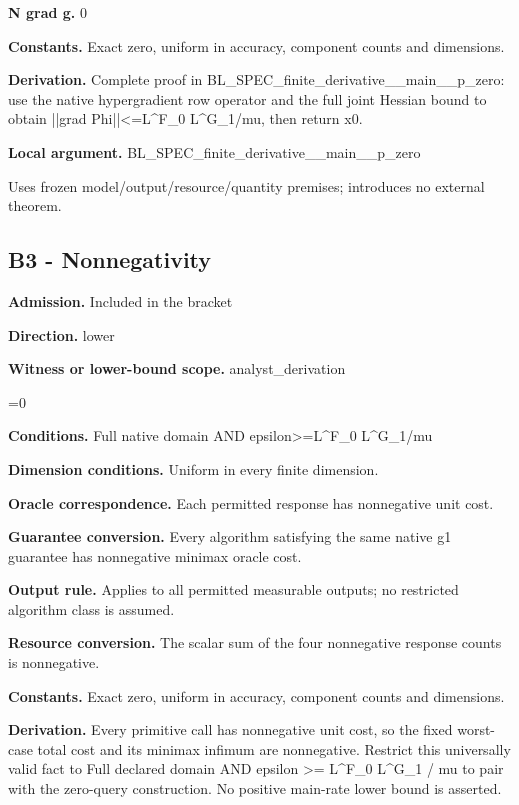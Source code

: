 \documentclass[10pt,a4paper]{article}
\newcommand{\AtlasMath}[1]{\par\begingroup\centering\setbox0=\hbox{$\displaystyle #1$}\ifdim\wd0>1.4\linewidth\typeout{ATLAS WIDE FORMULA: \the\wd0}\fi\ifdim\wd0>\linewidth\resizebox{\linewidth}{!}{\box0}\else\box0\fi\par\endgroup}
\begin{document}
\textbf{N grad g.} 0

\textbf{Constants.} Exact zero, uniform in accuracy, component counts and dimensions.

\textbf{Derivation.} Complete proof in BL\_\allowbreak{}SPEC\_\allowbreak{}finite\_\allowbreak{}derivative\_\allowbreak{}\_\allowbreak{}main\_\allowbreak{}\_\allowbreak{}p\_\allowbreak{}zero: use the native hypergradient row operator and the full joint Hessian bound to obtain ||grad Phi||<=L\textasciicircum{}F\_\allowbreak{}0 L\textasciicircum{}G\_\allowbreak{}1/mu, then return x0.

\textbf{Local argument.} BL\_\allowbreak{}SPEC\_\allowbreak{}finite\_\allowbreak{}derivative\_\allowbreak{}\_\allowbreak{}main\_\allowbreak{}\_\allowbreak{}p\_\allowbreak{}zero

Uses frozen model/output/resource/quantity premises; introduces no external theorem.

\subsection{B3 - Nonnegativity}
\textbf{Admission.} Included in the bracket

\textbf{Direction.} lower

\textbf{Witness or lower-bound scope.} analyst\_\allowbreak{}derivation

\AtlasMath{0}
\textbf{Conditions.} Full native domain AND epsilon>=L\textasciicircum{}F\_\allowbreak{}0 L\textasciicircum{}G\_\allowbreak{}1/mu

\textbf{Dimension conditions.} Uniform in every finite dimension.

\textbf{Oracle correspondence.} Each permitted response has nonnegative unit cost.

\textbf{Guarantee conversion.} Every algorithm satisfying the same native g1 guarantee has nonnegative minimax oracle cost.

\textbf{Output rule.} Applies to all permitted measurable outputs; no restricted algorithm class is assumed.

\textbf{Resource conversion.} The scalar sum of the four nonnegative response counts is nonnegative.

\textbf{Constants.} Exact zero, uniform in accuracy, component counts and dimensions.

\textbf{Derivation.} Every primitive call has nonnegative unit cost, so the fixed worst-case total cost and its minimax infimum are nonnegative. Restrict this universally valid fact to Full declared domain AND epsilon >= L\textasciicircum{}F\_\allowbreak{}0 L\textasciicircum{}G\_\allowbreak{}1 / mu to pair with the zero-query construction. No positive main-rate lower bound is asserted.
\end{document}
